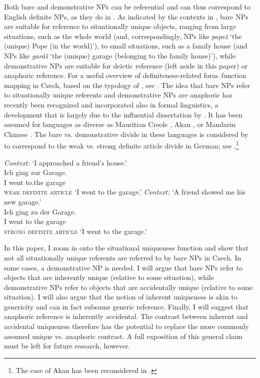 \documentclass[output=paper,colorlinks,citecolor=brown,newtxmath]{langscibook}
\begin{document}
\noindent Both bare and demonstrative NPs can be referential and can thus correspond to English definite NPs, as they do in . As indicated by the contexts in , bare NPs are suitable for reference to situationally unique objects, ranging from large situations, such as the whole world (and, correspondingly, NPs like \textit{papež} `the (unique) Pope (in the world)'), to small situations, such as a family house (and NPs like \textit{garáž} `the (unique) garage (belonging to the family house)'), while demonstrative NPs are suitable for deictic reference (left aside in this paper) or anaphoric reference. For a useful overview of definiteness-related form--function mapping in Czech, based on the typology of \citet{Hawkins1978}, see \citet[chapter 3]{Belicova.Uhlirova1996}. The idea that bare NPs refer to situationally unique referents and demonstrative NPs are anaphoric has recently been recognized and incorporated also in formal linguistics, a development that is largely due to the influential dissertation by \citet{Schwarz2009}. It has been assumed for languages as diverse as Mauritian Creole \citep{Wespel2008}, Akan \citep{Arkoh.Matthewson2013}, or Mandarin Chinese \citep{Jenks2018}. The bare vs. demonstrative divide in these languages is considered by \citet{Schwarz2013} to correspond to the weak vs. strong definite article divide in German; see .\footnote{The case of Akan has been reconsidered in \citet{Bombi2018}.}

\largerpage[-1] %

\ea \label{simik:ex:ger:weak-strong}\ea\textit{Context:} `I approached a friend's house.'\label{simik:ex:ger:weak-strong-a}\\
\gll Ich ging zur Garage.\\
I went to.the garage\\\hfill\textsc{weak definite article}
\glt `I went to the garage.'
\ex \textit{Context:} `A friend showed me his new garage.'\label{simik:ex:ger:weak-strong-b}\\
\gll Ich ging zu der Garage.\\
I went to the garage\\\hfill\textsc{strong definite article}
\glt `I went to the garage.'
\z\z

\noindent In this paper, I zoom in onto the situational uniqueness function and show that not all situationally unique referents are referred to by bare NPs in Czech. In some cases, a demonstrative NP is needed. I will argue that bare NPs refer to objects that are inherently unique (relative to some situation), while demonstrative NPs refer to objects that are accidentally unique (relative to some situation). I will also argue that the notion of inherent uniqueness is akin to genericity and can in fact subsume generic reference. Finally, I will suggest that anaphoric reference is inherently accidental. The contrast between inherent and accidental uniqueness therefore has the potential to replace the more commonly assumed unique vs. anaphoric contrast. A full exposition of this general claim must be left for future research, however.
\end{document}
